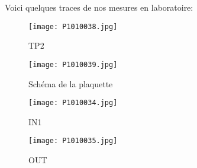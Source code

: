 
Voici quelques traces de nos  mesures en laboratoire:


\begin{figure}[ht!]
    \centering
    \texttt{[image: P1010038.jpg]}
    \caption{TP2}
    \label{TP2}
\end{figure}

\begin{figure}[ht!]
    \centering
    \texttt{[image: P1010039.jpg]}
    \caption{Schéma de la plaquette}
    \label{plaquette}
\end{figure}

\begin{figure}[ht!]
    \centering
    \texttt{[image: P1010034.jpg]}
    \caption{IN1}
    \label{IN1}
\end{figure}

\begin{figure}[ht!]
    \centering
    \texttt{[image: P1010035.jpg]}
    \caption{OUT}
    \label{OUT}
\end{figure}


